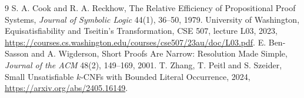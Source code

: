 \documentclass[11pt]{article}
\begin{document}
\begin{thebibliography}{9}
 S. A. Cook and R. A. Reckhow,
The Relative Efficiency of Propositional
Proof Systems, \emph{Journal of Symbolic
Logic} 44(1), 36--50, 1979.
 University of Washington,
Equisatisfiability and Tseitin's Transformation,
CSE 507, lecture L03, 2023,
\url{https://courses.cs.washington.edu/courses/cse507/23au/doc/L03.pdf}.
 E. Ben-Sasson and A. Wigderson,
Short Proofs Are Narrow: Resolution Made Simple,
\emph{Journal of the ACM} 48(2), 149--169, 2001.
 T. Zhang, T. Peitl and S. Szeider,
Small Unsatisfiable $k$-CNFs with Bounded
Literal Occurrence, 2024,
\url{https://arxiv.org/abs/2405.16149}.
\end{thebibliography}
\end{document}
